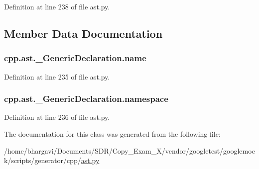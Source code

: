Definition at line 238 of file ast.\+py.



\subsection{Member Data Documentation}
\subsubsection[{\texorpdfstring{name}{name}}]{\setlength{\rightskip}{0pt plus 5cm}cpp.\+ast.\+\_\+\+Generic\+Declaration.\+name}\hypertarget{classcpp_1_1ast_1_1___generic_declaration_af774f4729dfd78d0538a6782fe8514c1}{}\label{classcpp_1_1ast_1_1___generic_declaration_af774f4729dfd78d0538a6782fe8514c1}


Definition at line 235 of file ast.\+py.

\subsubsection[{\texorpdfstring{namespace}{namespace}}]{\setlength{\rightskip}{0pt plus 5cm}cpp.\+ast.\+\_\+\+Generic\+Declaration.\+namespace}\hypertarget{classcpp_1_1ast_1_1___generic_declaration_a8aee3f11b37449d54b42a78e0a689f46}{}\label{classcpp_1_1ast_1_1___generic_declaration_a8aee3f11b37449d54b42a78e0a689f46}


Definition at line 236 of file ast.\+py.



The documentation for this class was generated from the following file\+:\begin{DoxyCompactItemize}
\item 
/home/bhargavi/\+Documents/\+S\+D\+R/\+Copy\+\_\+\+Exam\+\_\+X/vendor/googletest/googlemock/scripts/generator/cpp/\hyperlink{ast_8py}{ast.\+py}\end{DoxyCompactItemize}
